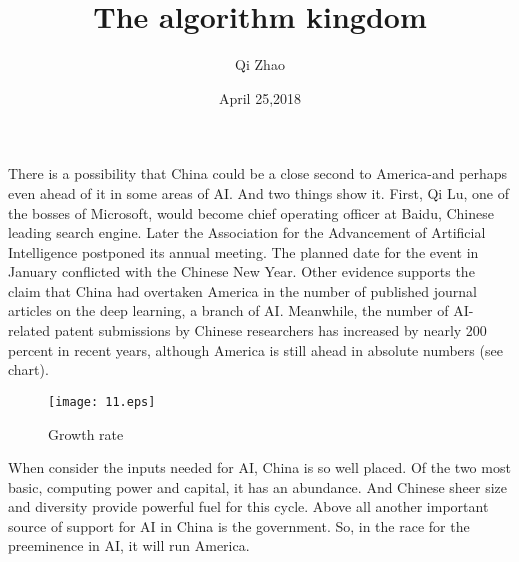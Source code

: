 \documentclass{article}
\author{Qi Zhao}
\date{April 25,2018}
\title{The algorithm kingdom}
\newcommand{\upcite}[1]{\textsuperscript{\textsuperscript{\cite{#1}}}}
\begin{document}
\maketitle
\par There is a possibility that China could be a close second to America-and perhaps even ahead of it in some areas of AI. And two things show it. First, Qi Lu, one of the bosses of Microsoft, would become chief operating officer at Baidu, Chinese leading search engine. Later the Association for the Advancement of Artificial Intelligence postponed its annual meeting. The planned date for the event in January conflicted with the Chinese New Year. Other evidence supports the claim that China had overtaken America in the number of published journal articles on the deep learning\upcite{Lecun2015Deep}, a branch of AI. Meanwhile, the number of AI-related patent submissions by Chinese researchers has increased by nearly 200 percent in recent years, although America is still ahead in absolute numbers (see chart).
\begin{figure}[htbp]
\centering
\texttt{[image: 11.eps]}
\caption{Growth rate}
\label{1}
\end{figure}

\par When consider the inputs needed for AI, China is so well placed. Of the two most basic, computing power and capital, it has an abundance. And Chinese sheer size and diversity provide powerful fuel for this cycle. Above all another important source of support for AI in China is the government. So, in the race for the preeminence in AI, it will run America.
\section*{}


\end{document}
